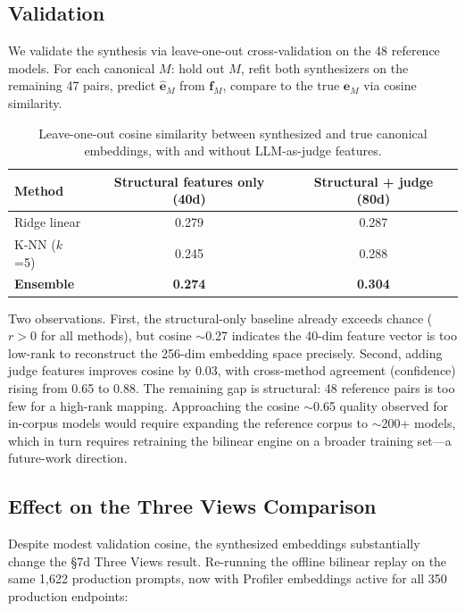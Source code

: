 \subsection{Validation}

We validate the synthesis via leave-one-out cross-validation on the 48 reference models. For each canonical $M$: hold out $M$, refit both synthesizers on the remaining 47 pairs, predict $\hat{\mathbf{e}}_M$ from $\mathbf{f}_M$, compare to the true $\mathbf{e}_M$ via cosine similarity.

\begin{table}[h]
\centering
\caption{Leave-one-out cosine similarity between synthesized and true canonical embeddings, with and without LLM-as-judge features.}
\label{tab:profiler_validation}
\small
\begin{tabular}{lcc}
\toprule
\textbf{Method} & \textbf{Structural features only (40d)} & \textbf{Structural + judge (80d)} \\
\midrule
Ridge linear & 0.279 & 0.287 \\
K-NN ($k$=5) & 0.245 & 0.288 \\
\textbf{Ensemble} & \textbf{0.274} & \textbf{0.304} \\
\bottomrule
\end{tabular}
\end{table}

Two observations. First, the structural-only baseline already exceeds chance ($r > 0$ for all methods), but cosine $\sim$0.27 indicates the 40-dim feature vector is too low-rank to reconstruct the 256-dim embedding space precisely. Second, adding judge features improves cosine by 0.03, with cross-method agreement (confidence) rising from 0.65 to 0.88. The remaining gap is structural: 48 reference pairs is too few for a high-rank mapping. Approaching the cosine $\sim$0.65 quality observed for in-corpus models would require expanding the reference corpus to $\sim$200+ models, which in turn requires retraining the bilinear engine on a broader training set---a future-work direction.

\subsection{Effect on the Three Views Comparison}

Despite modest validation cosine, the synthesized embeddings substantially change the §7d Three Views result. Re-running the offline bilinear replay on the same 1{,}622 production prompts, now with Profiler embeddings active for all 350 production endpoints:

